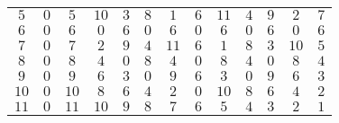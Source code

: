 \documentclass[12pt, a4paper]{article}
\begin{document}
\begin{solution}
\begin{center}
\begin{table}[h]
\begin{tabular}{ccccccccccccc}
\multicolumn{1}{c|}{$5$}  & \multicolumn{1}{c|}{$0$} & \multicolumn{1}{c|}{$5$}  & \multicolumn{1}{c|}{$10$} & \multicolumn{1}{c|}{$3$} & \multicolumn{1}{c|}{$8$} & \multicolumn{1}{c|}{$1$}  & \multicolumn{1}{c|}{$6$} & \multicolumn{1}{c|}{$11$} & \multicolumn{1}{c|}{$4$} & \multicolumn{1}{c|}{$9$} & \multicolumn{1}{c|}{$2$}  & \multicolumn{1}{c|}{$7$}  \\ \cline{2-13} 
\multicolumn{1}{c|}{$6$}  & \multicolumn{1}{c|}{$0$} & \multicolumn{1}{c|}{$6$}  & \multicolumn{1}{c|}{$0$}  & \multicolumn{1}{c|}{$6$} & \multicolumn{1}{c|}{$0$} & \multicolumn{1}{c|}{$6$}  & \multicolumn{1}{c|}{$0$} & \multicolumn{1}{c|}{$6$}  & \multicolumn{1}{c|}{$0$} & \multicolumn{1}{c|}{$6$} & \multicolumn{1}{c|}{$0$}  & \multicolumn{1}{c|}{$6$}  \\ \cline{2-13} 
\multicolumn{1}{c|}{$7$}  & \multicolumn{1}{c|}{$0$} & \multicolumn{1}{c|}{$7$}  & \multicolumn{1}{c|}{$2$}  & \multicolumn{1}{c|}{$9$} & \multicolumn{1}{c|}{$4$} & \multicolumn{1}{c|}{$11$} & \multicolumn{1}{c|}{$6$} & \multicolumn{1}{c|}{$1$}  & \multicolumn{1}{c|}{$8$} & \multicolumn{1}{c|}{$3$} & \multicolumn{1}{c|}{$10$} & \multicolumn{1}{c|}{$5$}  \\ \cline{2-13} 
\multicolumn{1}{c|}{$8$}  & \multicolumn{1}{c|}{$0$} & \multicolumn{1}{c|}{$8$}  & \multicolumn{1}{c|}{$4$}  & \multicolumn{1}{c|}{$0$} & \multicolumn{1}{c|}{$8$} & \multicolumn{1}{c|}{$4$}  & \multicolumn{1}{c|}{$0$} & \multicolumn{1}{c|}{$8$}  & \multicolumn{1}{c|}{$4$} & \multicolumn{1}{c|}{$0$} & \multicolumn{1}{c|}{$8$}  & \multicolumn{1}{c|}{$4$}  \\ \cline{2-13} 
\multicolumn{1}{c|}{$9$}  & \multicolumn{1}{c|}{$0$} & \multicolumn{1}{c|}{$9$}  & \multicolumn{1}{c|}{$6$}  & \multicolumn{1}{c|}{$3$} & \multicolumn{1}{c|}{$0$} & \multicolumn{1}{c|}{$9$}  & \multicolumn{1}{c|}{$6$} & \multicolumn{1}{c|}{$3$}  & \multicolumn{1}{c|}{$0$} & \multicolumn{1}{c|}{$9$} & \multicolumn{1}{c|}{$6$}  & \multicolumn{1}{c|}{$3$}  \\ \cline{2-13} 
\multicolumn{1}{c|}{$10$} & \multicolumn{1}{c|}{$0$} & \multicolumn{1}{c|}{$10$} & \multicolumn{1}{c|}{$8$}  & \multicolumn{1}{c|}{$6$} & \multicolumn{1}{c|}{$4$} & \multicolumn{1}{c|}{$2$}  & \multicolumn{1}{c|}{$0$} & \multicolumn{1}{c|}{$10$} & \multicolumn{1}{c|}{$8$} & \multicolumn{1}{c|}{$6$} & \multicolumn{1}{c|}{$4$}  & \multicolumn{1}{c|}{$2$}  \\ \cline{2-13} 
\multicolumn{1}{c|}{$11$} & \multicolumn{1}{c|}{$0$} & \multicolumn{1}{c|}{$11$} & \multicolumn{1}{c|}{$10$} & \multicolumn{1}{c|}{$9$} & \multicolumn{1}{c|}{$8$} & \multicolumn{1}{c|}{$7$}  & \multicolumn{1}{c|}{$6$} & \multicolumn{1}{c|}{$5$}  & \multicolumn{1}{c|}{$4$} & \multicolumn{1}{c|}{$3$} & \multicolumn{1}{c|}{$2$}  & \multicolumn{1}{c|}{$1$}  \\ \cline{2-13} 
\end{tabular}
\end{table}
\end{center}
\end{solution}
\end{document}
